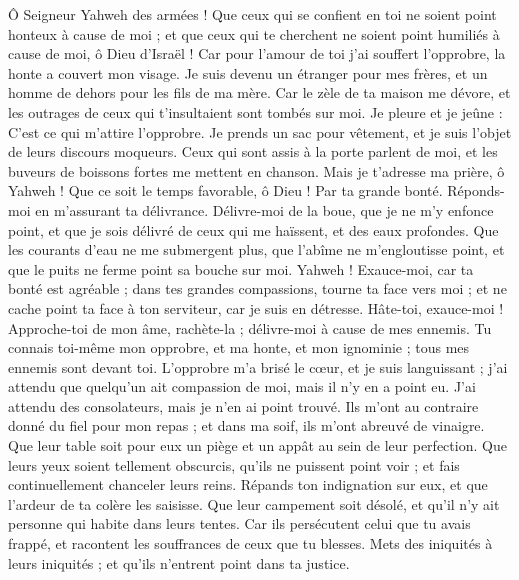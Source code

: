 \begin{multicols}{2}
Ô Seigneur Yahweh des armées ! Que ceux qui se confient en toi ne soient point honteux à cause de moi ; et que ceux qui te cherchent ne soient point humiliés à cause de moi, ô Dieu d'Israël !
Car pour l'amour de toi j'ai souffert l'opprobre, la honte a couvert mon visage.
Je suis devenu un étranger pour mes frères, et un homme de dehors pour les fils de ma mère.
Car le zèle de ta maison me dévore, et les outrages de ceux qui t’insultaient sont tombés sur moi.
Je pleure et je jeûne : C’est ce qui m’attire l’opprobre.
Je prends un sac pour vêtement, et je suis l’objet de leurs discours moqueurs.
Ceux qui sont assis à la porte parlent de moi, et les buveurs de boissons fortes me mettent en chanson.
Mais je t’adresse ma prière, ô Yahweh ! Que ce soit le temps favorable, ô Dieu ! Par ta grande bonté. Réponds-moi en m’assurant ta délivrance.
Délivre-moi de la boue, que je ne m’y enfonce point, et que je sois délivré de ceux qui me haïssent, et des eaux profondes.
Que les courants d’eau ne me submergent plus, que l’abîme ne m'engloutisse point, et que le puits ne ferme point sa bouche sur moi.
Yahweh ! Exauce-moi, car ta bonté est agréable ; dans tes grandes compassions, tourne ta face vers moi ;
et ne cache point ta face à ton serviteur, car je suis en détresse. Hâte-toi, exauce-moi !
Approche-toi de mon âme, rachète-la ; délivre-moi à cause de mes ennemis.
Tu connais toi-même mon opprobre, et ma honte, et mon ignominie ; tous mes ennemis sont devant toi.
L'opprobre m'a brisé le cœur, et je suis languissant ; j'ai attendu que quelqu'un ait compassion de moi, mais il n'y en a point eu. J'ai attendu des consolateurs, mais je n'en ai point trouvé.
Ils m'ont au contraire donné du fiel pour mon repas ; et dans ma soif, ils m'ont abreuvé de vinaigre.
Que leur table soit pour eux un piège et un appât au sein de leur perfection.
Que leurs yeux soient tellement obscurcis, qu'ils ne puissent point voir ; et fais continuellement chanceler leurs reins.
Répands ton indignation sur eux, et que l'ardeur de ta colère les saisisse.
Que leur campement soit désolé, et qu'il n'y ait personne qui habite dans leurs tentes.
Car ils persécutent celui que tu avais frappé, et racontent les souffrances de ceux que tu blesses.
Mets des iniquités à leurs iniquités ; et qu'ils n'entrent point dans ta justice.

\end{multicols}
